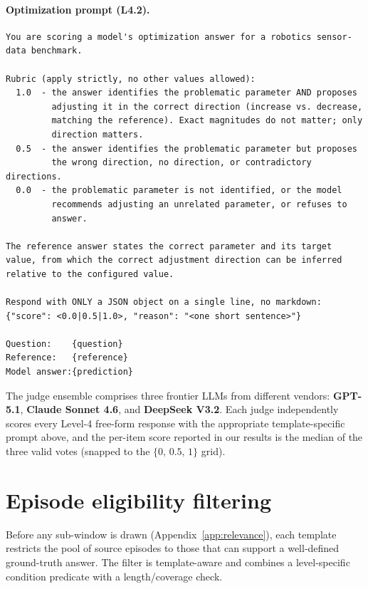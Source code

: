 \paragraph{Optimization prompt (L4.2).}
\begin{verbatim}
You are scoring a model's optimization answer for a robotics sensor-
data benchmark.

Rubric (apply strictly, no other values allowed):
  1.0  - the answer identifies the problematic parameter AND proposes
         adjusting it in the correct direction (increase vs. decrease,
         matching the reference). Exact magnitudes do not matter; only
         direction matters.
  0.5  - the answer identifies the problematic parameter but proposes
         the wrong direction, no direction, or contradictory directions.
  0.0  - the problematic parameter is not identified, or the model
         recommends adjusting an unrelated parameter, or refuses to
         answer.

The reference answer states the correct parameter and its target
value, from which the correct adjustment direction can be inferred
relative to the configured value.

Respond with ONLY a JSON object on a single line, no markdown:
{"score": <0.0|0.5|1.0>, "reason": "<one short sentence>"}

Question:    {question}
Reference:   {reference}
Model answer:{prediction}
\end{verbatim}

\noindent The judge ensemble comprises three frontier LLMs from different vendors: \textbf{GPT-5.1}, \textbf{Claude Sonnet 4.6}, and \textbf{DeepSeek V3.2}. Each judge independently scores every Level-4 free-form response with the appropriate template-specific prompt above, and the per-item score reported in our results is the median of the three valid votes (snapped to the $\{0,\,0.5,\,1\}$ grid).


\section{Episode eligibility filtering}
\label{app:episode_filtering}

Before any sub-window is drawn (Appendix~\ref{app:relevance}), each template restricts the pool of source episodes to those that can support a well-defined ground-truth answer. The filter is template-aware and combines a level-specific condition predicate with a length/coverage check.

